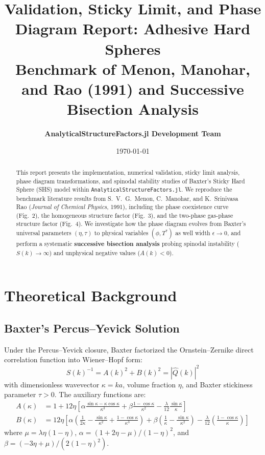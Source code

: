 \documentclass[11pt,a4paper]{article}
\title{\textbf{Validation, Sticky Limit, and Phase Diagram Report: Adhesive Hard Spheres}\\[0.5em]
\large Benchmark of Menon, Manohar, and Rao (1991) and Successive Bisection Analysis}
\author{\textbf{AnalyticalStructureFactors.jl Development Team}}
\date{\today}
\begin{document}
\maketitle

\begin{abstract}
This report presents the implementation, numerical validation, sticky limit analysis, phase diagram transformations, and spinodal stability studies of Baxter's Sticky Hard Sphere (SHS) model within \texttt{AnalyticalStructureFactors.jl}. We reproduce the benchmark literature results from S.~V.~G.~Menon, C.~Manohar, and K.~Srinivasa Rao (\textit{Journal of Chemical Physics}, 1991), including the phase coexistence curve (Fig.~2), the homogeneous structure factor (Fig.~3), and the two-phase gas-phase structure factor (Fig.~4). We investigate how the phase diagram evolves from Baxter's universal parameters $(\eta, \tau)$ to physical variables $(\phi, T^*)$ as well width $\epsilon \to 0$, and perform a systematic \textbf{successive bisection analysis} probing spinodal instability ($S(k) \to \infty$) and unphysical negative values ($A(k) < 0$).
\end{abstract}

\section{Theoretical Background}

\subsection{Baxter's Percus--Yevick Solution}
Under the Percus--Yevick closure, Baxter factorized the Ornstein--Zernike direct correlation function into Wiener--Hopf form:
\begin{equation}
    S(k)^{-1} = A(k)^2 + B(k)^2 = |\hat{Q}(k)|^2
\end{equation}
with dimensionless wavevector $\kappa = ka$, volume fraction $\eta$, and Baxter stickiness parameter $\tau > 0$. The auxiliary functions are:
\begin{align}
    A(\kappa) &= 1 + 12\eta \left[ \alpha \frac{\sin\kappa - \kappa\cos\kappa}{\kappa^3} + \beta \frac{1 - \cos\kappa}{\kappa^2} - \frac{\lambda}{12} \frac{\sin\kappa}{\kappa} \right] \\
    B(\kappa) &= 12\eta \left[ \alpha \left( \frac{1}{2\kappa} - \frac{\sin\kappa}{\kappa^2} + \frac{1 - \cos\kappa}{\kappa^3} \right) + \beta \left( \frac{1}{\kappa} - \frac{\sin\kappa}{\kappa^2} \right) - \frac{\lambda}{12} \left( \frac{1 - \cos\kappa}{\kappa} \right) \right]
\end{align}
where $\mu = \lambda\eta(1-\eta)$, $\alpha = (1 + 2\eta - \mu)/(1-\eta)^2$, and $\beta = (-3\eta + \mu)/(2(1-\eta)^2)$.
\end{document}
